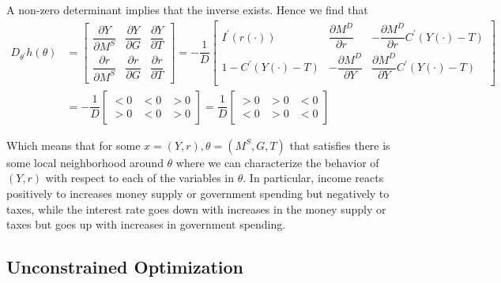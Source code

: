 \documentclass{article}
\begin{document}
A non-zero determinant implies that the inverse exists. Hence we find that
\begin{align*}
  D_{\theta^\prime} h(\theta)
  & =
  \left[\begin{matrix}
      \dfrac{\partial Y}{\partial M^S}
    & \dfrac{\partial Y}{\partial G}
    & \dfrac{\partial Y}{\partial T} \\[6pt]
      \dfrac{\partial r}{\partial M^S}
    & \dfrac{\partial r}{\partial G}
    & \dfrac{\partial r}{\partial T}
  \end{matrix}\right]
  =
  - \dfrac{1}{D}
  \left[\begin{matrix}
        I^\prime(r(\cdot))
    &   \dfrac{\partial M^D}{\partial r}
    & - \dfrac{\partial M^D}{\partial r} C^\prime(Y(\cdot) - T)
    \\[6pt]
        1 - C^\prime(Y(\cdot) - T)
    & - \dfrac{\partial M^D}{\partial Y}
    &   \dfrac{\partial M^D}{\partial Y} C^\prime(Y(\cdot) - T)
    \\[6pt]
  \end{matrix}\right] \\
  & =
  - \dfrac{1}{D}
  \left[\begin{matrix}
      < 0
    & < 0
    & > 0 \\[6pt]
      > 0
    & < 0
    & > 0
  \end{matrix}\right]
  =
  \dfrac{1}{D}
  \left[\begin{matrix}
      > 0
    & > 0
    & < 0 \\[6pt]
      < 0
    & > 0
    & < 0
  \end{matrix}\right]
\end{align*}

Which means that for some $x = (Y, r), \theta = (M^S, G, T)$ that satisfies  there is some local neighborhood around $\theta$ where we can characterize the behavior of $(Y, r)$ with respect to each of the variables in $\theta$. In particular, income reacts positively to increases money supply or government spending but negatively to taxes, while the interest rate goes down with increases in the money supply or taxes but goes up with increases in government spending.

\subsection{Unconstrained Optimization}
\label{sub:unconstrained_optimization}
\end{document}
